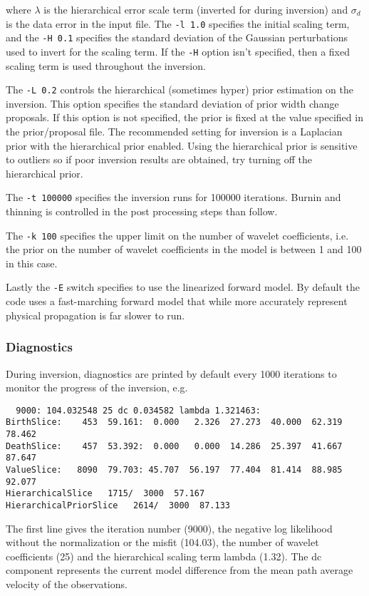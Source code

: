 \documentclass[a4paper,12pt]{article}
\begin{document}
where $\lambda$ is the hierarchical error scale term (inverted for
during inversion) and $\sigma_d$ is the data error in the input
file. The {\tt -l 1.0} specifies the initial scaling term, and the
{\tt -H 0.1} specifies the standard deviation of the Gaussian
perturbations used to invert for the scaling term. If the {\tt -H}
option isn't specified, then a fixed scaling term is used throughout
the inversion.

The {\tt -L 0.2} controls the hierarchical (sometimes hyper) prior estimation
on the inversion. This option specifies the standard deviation of prior
width change proposals. If this option is not specified, the prior is fixed
at the value specified in the prior/proposal file. The recommended
setting for inversion is a Laplacian prior with the hierarchical prior
enabled. Using the hierarchical prior is sensitive to outliers so if
poor inversion results are obtained, try turning off the hierarchical
prior.

The {\tt -t 100000} specifies the inversion runs for 100000 iterations.
Burnin and thinning is controlled in the post processing steps than follow.

The {\tt -k 100} specifies the upper limit on the number of wavelet
coefficients, i.e. the prior on the number of wavelet coefficients in the
model is between 1 and 100 in this case.

Lastly the {\tt -E} switch specifies to use the linearized forward model.
By default the code uses a fast-marching forward model that while more accurately
represent physical propagation is far slower to run.

\subsubsection{Diagnostics}

During inversion, diagnostics are printed by default every 1000 iterations
to monitor the progress of the inversion, e.g.

\begin{verbatim}
  9000: 104.032548 25 dc 0.034582 lambda 1.321463:
BirthSlice:    453  59.161:  0.000   2.326  27.273  40.000  62.319  78.462 
DeathSlice:    457  53.392:  0.000   0.000  14.286  25.397  41.667  87.647 
ValueSlice:   8090  79.703: 45.707  56.197  77.404  81.414  88.985  92.077
HierarchicalSlice   1715/  3000  57.167
HierarchicalPriorSlice   2614/  3000  87.133
\end{verbatim}

The first line gives the iteration number (9000), the negative log likelihood
without the normalization or the misfit (104.03), the number of wavelet
coefficients (25) and the hierarchical scaling term lambda (1.32). The dc
component represents the current model difference from the mean
path average velocity of the observations.
\end{document}
